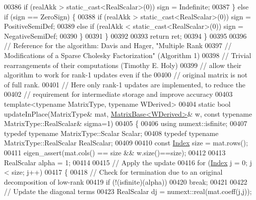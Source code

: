 \begin{DoxyCode}
00386         \textcolor{keywordflow}{if} (realAkk > static\_cast<RealScalar>(0)) sign = Indefinite;
00387       \} \textcolor{keywordflow}{else} \textcolor{keywordflow}{if} (sign == ZeroSign) \{
00388         \textcolor{keywordflow}{if} (realAkk > static\_cast<RealScalar>(0)) sign = PositiveSemiDef;
00389         \textcolor{keywordflow}{else} \textcolor{keywordflow}{if} (realAkk < static\_cast<RealScalar>(0)) sign = NegativeSemiDef;
00390       \}
00391     \}
00392 
00393     \textcolor{keywordflow}{return} ret;
00394   \}
00395 
00396   \textcolor{comment}{// Reference for the algorithm: Davis and Hager, "Multiple Rank}
00397   \textcolor{comment}{// Modifications of a Sparse Cholesky Factorization" (Algorithm 1)}
00398   \textcolor{comment}{// Trivial rearrangements of their computations (Timothy E. Holy)}
00399   \textcolor{comment}{// allow their algorithm to work for rank-1 updates even if the}
00400   \textcolor{comment}{// original matrix is not of full rank.}
00401   \textcolor{comment}{// Here only rank-1 updates are implemented, to reduce the}
00402   \textcolor{comment}{// requirement for intermediate storage and improve accuracy}
00403   \textcolor{keyword}{template}<\textcolor{keyword}{typename} MatrixType, \textcolor{keyword}{typename} WDerived>
00404   \textcolor{keyword}{static} \textcolor{keywordtype}{bool} updateInPlace(MatrixType& mat, \hyperlink{group___core___module_class_eigen_1_1_matrix_base}{MatrixBase<WDerived>}& w, \textcolor{keyword}{const} \textcolor{keyword}{typename} 
      MatrixType::RealScalar& sigma=1)
00405   \{
00406     \textcolor{keyword}{using} numext::isfinite;
00407     \textcolor{keyword}{typedef} \textcolor{keyword}{typename} MatrixType::Scalar Scalar;
00408     \textcolor{keyword}{typedef} \textcolor{keyword}{typename} MatrixType::RealScalar RealScalar;
00409 
00410     \textcolor{keyword}{const} \hyperlink{group___cholesky___module_ad9c57eb2fb3bbccd51b9d2e111bea355}{Index} size = mat.rows();
00411     eigen\_assert(mat.cols() == size && w.size()==size);
00412 
00413     RealScalar alpha = 1;
00414 
00415     \textcolor{comment}{// Apply the update}
00416     \textcolor{keywordflow}{for} (\hyperlink{group___cholesky___module_ad9c57eb2fb3bbccd51b9d2e111bea355}{Index} j = 0; j < size; j++)
00417     \{
00418       \textcolor{comment}{// Check for termination due to an original decomposition of low-rank}
00419       \textcolor{keywordflow}{if} (!(isfinite)(alpha))
00420         \textcolor{keywordflow}{break};
00421 
00422       \textcolor{comment}{// Update the diagonal terms}
00423       RealScalar dj = numext::real(mat.coeff(j,j));

\end{DoxyCode}
